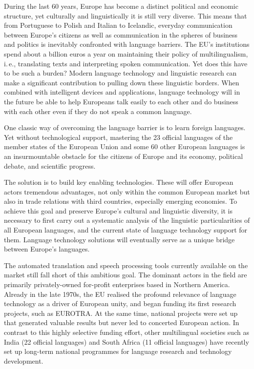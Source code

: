 \begin{multicols}{2}
During the last 60 years, Europe has become a distinct political and economic structure, yet culturally and linguistically it is still very diverse. This means that from Portuguese to Polish and Italian to Icelandic, everyday communication between Europe’s citizens as well as communication in the spheres of business and politics is inevitably confronted with
 language barriers. The EU’s institutions spend about a billion euros a year on maintaining their policy of multilingualism, i.\,e., translating texts and interpreting spoken communication. Yet does this have to be such a burden? Modern language technology and linguistic research can make a significant contribution to pulling down these linguistic borders. When combined with intelligent devices and applications, language technology will in the future be able to help Europeans talk easily to each other and do business with each other even if they do not speak a common language. 


One classic way of overcoming the language barrier is to learn foreign languages. Yet without technological support, mastering the 23 official languages of the member states of the European Union and some 60 other European languages is an insurmountable obstacle for the citizens of Europe and its economy, political debate, and scientific progress.   

The solution is to build key enabling technologies. These will offer European actors tremendous advantages, not only within the common European market but also in trade relations with third countries, especially emerging economies. To achieve this goal and preserve Europe’s cultural and linguistic diversity, it is necessary to first carry out a systematic analysis of the linguistic particularities of all European languages, and the current state of language technology support for them. Language technology solutions will eventually serve as a unique bridge between Europe’s languages. 

The automated translation and speech processing tools currently available on the market still fall short of this ambitious goal. The dominant actors in the field are primarily privately-owned for-profit enterprises based in Northern America. Already in the late 1970s, the EU realised the profound relevance of language technology as a driver of European unity, and began funding its first research projects, such as EUROTRA. At the same time, national projects were set up that generated valuable results but never led to concerted European action. In contrast to this highly selective funding effort, other multilingual societies such as India (22 official languages) and South Africa (11 official languages) have recently set up long-term national programmes for language research and technology development. 



\end{multicols}
